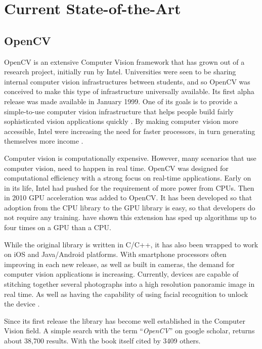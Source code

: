 \documentclass[11pt,oneside]{report}
\begin{document}
			
		\section{Current State-of-the-Art}
		
			\subsection{OpenCV}
				OpenCV is an extensive Computer Vision framework that has grown out of a research project, initially run by Intel.
				Universities were seen to be sharing internal computer vision infrastructures between students, and so OpenCV was conceived to make this type of infrastructure universally available.
				Its first alpha release was made available in January 1999.
				One of its goals is to provide a simple-to-use computer vision infrastructure that helps people build fairly sophisticated vision applications quickly \cite[p. 1]{definition:cv}.	
				By making computer vision more accessible, Intel were increasing the need for faster processors, in turn generating themselves more income \cite{definition:cv}.
				
				Computer vision is computationally expensive.
				However, many scenarios that use computer vision, need to happen in real time.
				OpenCV was designed for computational efficiency with a strong focus on real-time applications.
				Early on in its life, Intel had pushed for the requirement of more power from CPUs.
				Then in 2010 GPU acceleration was added to OpenCV.
				It has been developed so that adoption from the CPU library to the GPU library is easy, so that developers do not require any training.
				 have shown this extension has sped up algorithms up to four times on a GPU than a CPU.
				
				While the original library is written in C/C++, it has also been wrapped to work on iOS and Java/Android platforms.
				With smartphone processors often improving in each new release, as well as built in cameras, the demand for computer vision applications is increasing.
				Currently, devices are capable of stitching together several photographs into a high resolution panoramic image in real time.
				As well as having the capability of using facial recognition to unlock the device \cite{journal:face}.
				
				Since its first release the library has become well established in the Computer Vision field.
				A simple search with the term ``\textit{OpenCV}'' on google scholar, returns about 38,700 results.
				With the  book itself cited by 3409 others.
				
\end{document}
